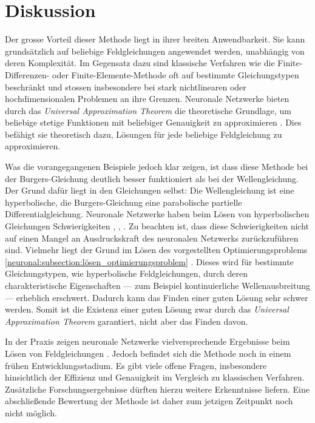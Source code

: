 %
%
%
%

\section{Diskussion}\label{neuronal:section:diskussion}

Der grosse Vorteil dieser Methode liegt in ihrer breiten Anwendbarkeit.
Sie kann grundsätzlich auf beliebige Feldgleichungen angewendet werden, unabhängig von deren Komplexität.
Im Gegensatz dazu sind klassische Verfahren wie die Finite-Differenzen- oder Finite-Elemente-Methode oft auf bestimmte Gleichungstypen beschränkt und stossen insbesondere bei stark nichtlinearen oder hochdimensionalen Problemen an ihre Grenzen.
%
%
Neuronale Netzwerke bieten durch das \emph{Universal Approximation Theorem} die theoretische Grundlage, um beliebige stetige Funktionen mit beliebiger Genauigkeit zu approximieren \cite{neuronal:universal_approximation_theorem}.
%
Dies befähigt sie theoretisch dazu, Lösungen für jede beliebige Feldgleichung zu approximieren.

Was die vorangegangenen Beispiele jedoch klar zeigen, ist dass diese Methode bei der Burgers-Gleichung deutlich besser funktioniert als bei der Wellengleichung.
Der Grund dafür liegt in den Gleichungen selbst: 
Die Wellengleichung ist eine hyperbolische, die Burgers-Gleichung eine parabolische partielle Differentialgleichung.
%
%
%
%
Neuronale Netzwerke haben beim Lösen von hyperbolischen Gleichungen Schwierigkeiten \cite{neuronal:hyperbolisch_1}, \cite{neuronal:hyperbolisch_2}, \cite{neuronal:hyperbolisch_3}.
Zu beachten ist, dass diese Schwierigkeiten nicht auf einen Mangel an Ausdruckskraft des neuronalen Netzwerks zurückzuführen sind.
Vielmehr liegt der Grund im Lösen des vorgestellten Optimierungsproblems \ref{neuronal:subsection:lösen_optimierungsproblem} \cite{neuronal:hyperbolisch_4}.
Dieses wird für bestimmte Gleichungstypen, wie hyperbolische Feldgleichungen, durch deren charakteristische Eigenschaften --- zum Beispiel kontinuierliche Wellenausbreitung --- erheblich erschwert.
Dadurch kann das Finden einer guten Lösung sehr schwer werden.
Somit ist die Existenz einer guten Lösung zwar durch das \emph{Universal Approximation Theorem} garantiert, nicht aber das Finden davon.

In der Praxis zeigen neuronale Netzwerke vielversprechende Ergebnisse beim Lösen von Feldgleichungen \cite{neuronal:pinns}.
Jedoch befindet sich die Methode noch in einem frühen Entwicklungsstadium.
Es gibt viele offene Fragen, insbesondere hinsichtlich der Effizienz und Genauigkeit im Vergleich zu klassischen Verfahren.
Zusätzliche Forschungsergebnisse dürften hierzu weitere Erkenntnisse liefern.
Eine abschließende Bewertung der Methode ist daher zum jetzigen Zeitpunkt noch nicht möglich.
